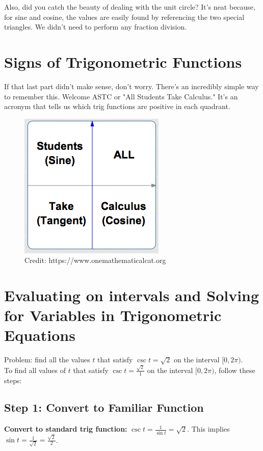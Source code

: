 \documentclass[12pt]{article}
\begin{document}
Also, did you catch the beauty of dealing with the unit circle? It's neat because, for sine and cosine, the values are easily found by referencing the two special triangles. We didn't need to perform any fraction division.\\

\section{Signs of Trigonometric Functions}

If that last part didn't make sense, don't worry. There's an incredibly simple way to remember this. Welcome ASTC or "All Students Take Calculus." It's an acronym that tells us which trig functions are positive in each quadrant.\\

\begin{figure}[ht]
	\centering
	\includegraphics[scale=.75]{memoryDeviceSigns}
	\caption{Credit: https://www.onemathematicalcat.org}
\end{figure}

\section{Evaluating on intervals and Solving for Variables in Trigonometric Equations}

Problem: find all the values \(t\) that satisfy \(\csc{t}=\sqrt{2}\) on the interval \([0,2\pi)\).\\

To find all values of \( t \) that satisfy \( \csc t = \frac{\sqrt{2}}{1} \) on the interval \( [0, 2\pi) \), follow these steps:

\subsection*{Step 1: Convert to Familiar Function}
\textbf{Convert to standard trig function:} \( \csc t = \frac{1}{\sin t} = \sqrt{2} \). This implies \( \sin t = \frac{1}{\sqrt{2}} = \frac{\sqrt{2}}{2} \).
\end{document}
